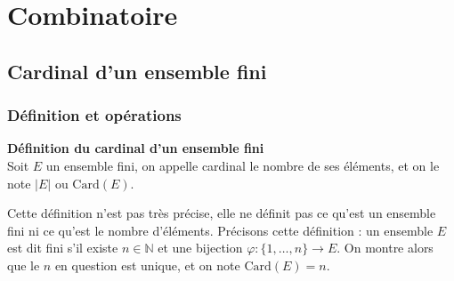 \documentclass[../PolyS4.tex]{subfiles}
\begin{document}
\setcounter{chapter}{0}
\chapter{Combinatoire}
\section{Cardinal d'un ensemble fini}
\subsection{Définition et opérations}

\begin{Def}\textbf{Définition du cardinal d'un ensemble fini}\\
Soit $E$ un ensemble fini, on appelle cardinal le nombre de ses éléments, et on le note $|E|$ ou $\mathrm{Card}(E)$.\\
\end{Def}


Cette définition n'est pas très précise, elle ne définit pas ce qu'est un ensemble fini ni ce qu'est le nombre d'éléments. 
Précisons cette définition : un ensemble $E$ est dit fini s'il existe $n \in \mathbb{N}$ et une bijection $\varphi : \{1, \ldots, n\} \to E$. On montre alors que le $n$ en question est unique, et on note $\mathrm{Card}(E) = n$.\\
\end{document}
